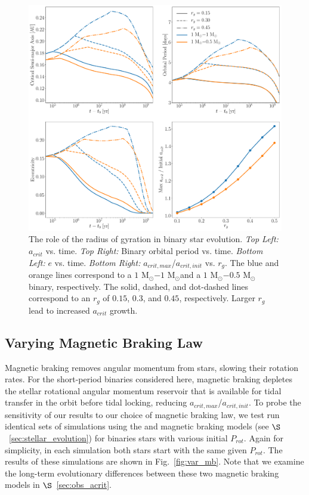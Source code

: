 \begin{figure}
	\includegraphics[width=\columnwidth]{var_rg.pdf}
    \caption{The role of the radius of gyration in binary star evolution. {\it Top Left:} $a_{crit}$ vs. time.  {\it Top Right:} Binary orbital period vs. time. {\it Bottom Left:} $e$ vs. time. {\it Bottom Right:} $a_{crit,max}$/$a_{crit,init}$ vs. $r_g$.  The blue and orange lines correspond to a $1$ M$_{\odot}$$-1$ M$_{\odot}$and a $1$ M$_{\odot}$$-0.5$ M$_{\odot}$ binary, respectively.  The solid, dashed, and dot-dashed lines correspond to an $r_g$ of $0.15$, $0.3$, and $0.45$, respectively.  Larger $r_g$ lead to increased $a_{crit}$ growth.}
    \label{fig:var_rg}
\end{figure}

\subsection{Varying Magnetic Braking Law} \label{sec:var_mb}

Magnetic braking removes angular momentum from stars, slowing their rotation rates.  For the short-period binaries considered here, magnetic braking depletes the stellar rotational angular momentum reservoir that is available for tidal transfer in the orbit before tidal locking, reducing $a_{crit,max}$/$a_{crit,init}$.  To probe the sensitivity of our results to our choice of magnetic braking law, we test run identical sets of simulations using the \citet{Reiners2012} and \citet{Repetto2014} magnetic braking models (see $\S$~\ref{sec:stellar_evolution}) for binaries stars with various initial $P_{rot}$.  Again for simplicity, in each simulation both stars start with the same given $P_{rot}$.  The results of these simulations are shown in Fig.~\ref{fig:var_mb}.  Note that we examine the long-term evolutionary differences between these two magnetic braking models in $\S$~\ref{sec:obs_acrit}.

